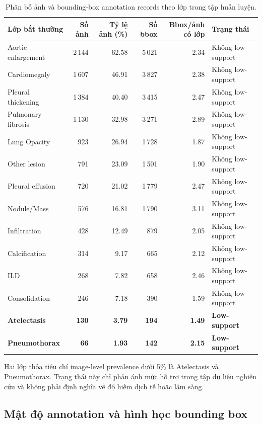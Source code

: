 \documentclass[pdflatex,sn-mathphys-num]{sn-jnl}%
\theoremstyle{thmstyleone}%
\theoremstyle{thmstyletwo}%
\theoremstyle{thmstylethree}%
\begin{document}
\begin{table}[htbp]
\centering
\caption{Phân bố ảnh và bounding-box annotation records theo lớp trong tập huấn luyện.}
\label{tab:supp_diag_class_distribution}
\small
\setlength{\tabcolsep}{4pt}
\begin{tabularx}{\textwidth}{@{}lrrrr>{\raggedright\arraybackslash}X@{}}
\toprule
\textbf{Lớp bất thường} & \textbf{Số ảnh} & \textbf{Tỷ lệ ảnh (\%)} & \textbf{Số bbox} & \textbf{Bbox/ảnh có lớp} & \textbf{Trạng thái}\\
\midrule
Aortic enlargement & 2\,144 & 62.58 & 5\,021 & 2.34 & Không low-support\\
Cardiomegaly & 1\,607 & 46.91 & 3\,827 & 2.38 & Không low-support\\
Pleural thickening & 1\,384 & 40.40 & 3\,415 & 2.47 & Không low-support\\
Pulmonary fibrosis & 1\,130 & 32.98 & 3\,271 & 2.89 & Không low-support\\
Lung Opacity & 923 & 26.94 & 1\,728 & 1.87 & Không low-support\\
Other lesion & 791 & 23.09 & 1\,501 & 1.90 & Không low-support\\
Pleural effusion & 720 & 21.02 & 1\,779 & 2.47 & Không low-support\\
Nodule/Mass & 576 & 16.81 & 1\,790 & 3.11 & Không low-support\\
Infiltration & 428 & 12.49 & 879 & 2.05 & Không low-support\\
Calcification & 314 & 9.17 & 665 & 2.12 & Không low-support\\
ILD & 268 & 7.82 & 658 & 2.46 & Không low-support\\
Consolidation & 246 & 7.18 & 390 & 1.59 & Không low-support\\
\textbf{Atelectasis} & \textbf{130} & \textbf{3.79} & \textbf{194} & \textbf{1.49} & \textbf{Low-support}\\
\textbf{Pneumothorax} & \textbf{66} & \textbf{1.93} & \textbf{142} & \textbf{2.15} & \textbf{Low-support}\\
\bottomrule
\end{tabularx}
\end{table}

Hai lớp thỏa tiêu chí image-level prevalence dưới 5\% là Atelectasis và Pneumothorax. Trạng thái này chỉ phản ánh mức hỗ trợ trong tập dữ liệu nghiên cứu và không phải định nghĩa về độ hiếm dịch tễ hoặc lâm sàng.


\subsection{Mật độ annotation và hình học bounding box}
\end{document}

